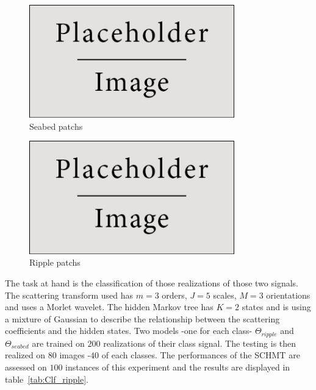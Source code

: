 \documentclass[a4paper,11pt]{report}
\begin{document}
		\begin{figure}
			\begin{center}
				\includegraphics[width=3.5in]{placeholder.jpg}
				\caption{Seabed patchs}
				\label{fig:Seabed patch}
			\end{center}
		\end{figure}
			
		\begin{figure}
			\begin{center}
				\includegraphics[width=3.5in]{placeholder.jpg}
				\caption{Ripple patchs}
				\label{fig:Ripple patch}
			\end{center}
		\end{figure}
		
		The task at hand is the classification of those realizations of those two signals. The scattering transform used has $m=3$ orders, $J=5$ scales, $M=3$ orientations and uses a Morlet wavelet. The hidden Markov tree has $K=2$ states and is using a mixture of Gaussian to describe the relationship between the scattering coefficients and the hidden states. Two models -one for each class- $\Theta_{ripple}$ and $\Theta_{seabed}$ are trained on $200$ realizations of their class signal. The testing is then realized on $80$ images -$40$ of each classes. The performances of the SCHMT are assessed on $100$ instances of this experiment and the results are displayed in table~\ref{tab:Clf_ripple}.\\
		
\end{document}
